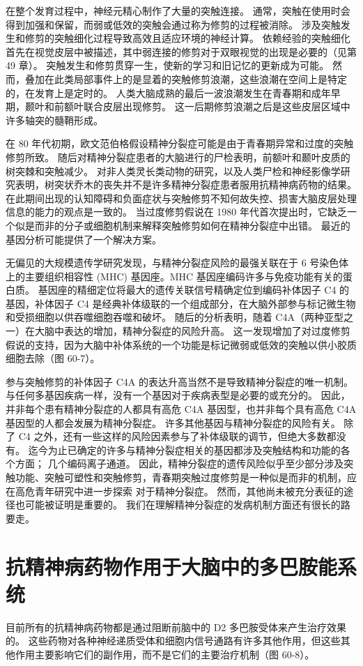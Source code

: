 在整个发育过程中，神经元精心制作了大量的突触连接。 通常，突触在使用时会得到加强和保留，而弱或低效的突触会通过称为修剪的过程被消除。 涉及突触发生和修剪的突触细化过程导致高效且适应环境的神经计算。 依赖经验的突触细化首先在视觉皮层中被描述，其中弱连接的修剪对于双眼视觉的出现是必要的（见第 49 章）。 突触发生和修剪贯穿一生，使新的学习和旧记忆的更新成为可能。 然而，叠加在此类局部事件上的是显着的突触修剪浪潮，这些浪潮在空间上是特定的，在发育上是定时的。 人类大脑成熟的最后一波浪潮发生在青春期和成年早期，颞叶和前额叶联合皮层出现修剪。 这一后期修剪浪潮之后是这些皮层区域中许多轴突的髓鞘形成。

在 80 年代初期，欧文范伯格假设精神分裂症可能是由于青春期异常和过度的突触修剪所致。 随后对精神分裂症患者的大脑进行的尸检表明，前额叶和颞叶皮质的树突棘和突触减少。 对非人类灵长类动物的研究，以及人类尸检和神经影像学研究表明，树突状乔木的丧失并不是许多精神分裂症患者服用抗精神病药物的结果。 在此期间出现的认知障碍和负面症状与突触修剪不知何故失控、损害大脑皮层处理信息的能力的观点是一致的。 当过度修剪假说在 1980 年代首次提出时，它缺乏一个似是而非的分子或细胞机制来解释突触修剪如何在精神分裂症中出错。 最近的基因分析可能提供了一个解决方案。

无偏见的大规模遗传学研究发现，与精神分裂症风险的最强关联在于 6 号染色体上的主要组织相容性 (MHC) 基因座。MHC 基因座编码许多与免疫功能有关的蛋白质。 基因座的精细定位将最大的遗传关联信号精确定位到编码补体因子 C4 的基因，补体因子 C4 是经典补体级联的一个组成部分，在大脑外部参与标记微生物和受损细胞以供吞噬细胞吞噬和破坏。 随后的分析表明，随着 C4A（两种亚型之一）在大脑中表达的增加，精神分裂症的风险升高。 这一发现增加了对过度修剪假说的支持，因为大脑中补体系统的一个功能是标记微弱或低效的突触以供小胶质细胞去除（图 60-7）。

参与突触修剪的补体因子 C4A 的表达升高当然不是导致精神分裂症的唯一机制。 与任何多基因疾病一样，没有一个基因对于疾病表型是必要的或充分的。 因此，并非每个患有精神分裂症的人都具有高危 C4A 基因型，也并非每个具有高危 C4A 基因型的人都会发展为精神分裂症。 许多其他基因与精神分裂症的风险有关。 除了 C4 之外，还有一些这样的风险因素参与了补体级联的调节，但绝大多数都没有。 迄今为止已确定的许多与精神分裂症相关的基因都涉及突触结构和功能的各个方面； 几个编码离子通道。 因此，精神分裂症的遗传风险似乎至少部分涉及突触功能、突触可塑性和突触修剪，青春期突触过度修剪是一种似是而非的机制，应在高危青年研究中进一步探索 对于精神分裂症。 然而，其他尚未被充分表征的途径也可能被证明是重要的。 我们在理解精神分裂症的发病机制方面还有很长的路要走。

\section{抗精神病药物作用于大脑中的多巴胺能系统}
目前所有的抗精神病药物都是通过阻断前脑中的 D2 多巴胺受体来产生治疗效果的。 这些药物对各种神经递质受体和细胞内信号通路有许多其他作用，但这些其他作用主要影响它们的副作用，而不是它们的主要治疗机制（图 60-8）。


